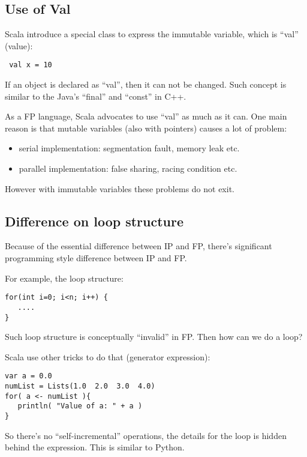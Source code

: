 \documentclass[notheorems, aspectratio=54]{beamer}
\begin{document}
\subsection{Use of Val}
\begin{frame}[fragile]

Scala introduce a special class to express the immutable variable, 
which is ``val'' (value):
\begin{verbatim}
 val x = 10
\end{verbatim}
If an object is declared as ``val'', then it can not be changed. Such concept 
is similar to the Java's ``final'' and ``const'' in C++. 

As a FP language, Scala advocates to use ``val'' as much as it can. One main reason is that mutable variables (also with pointers) causes a lot of problem:
\begin{itemize}
 \item serial implementation: segmentation fault, memory leak etc.
 \item parallel implementation: false sharing, racing condition etc.
\end{itemize}
However with immutable variables these problems do not exit.

\end{frame}

\subsection{Difference on loop structure}
\begin{frame}[fragile]

Because of the essential difference between IP and FP, there's 
significant programming style difference between IP and FP. 

For example, the loop structure:
\begin{verbatim}
for(int i=0; i<n; i++) {
   ....
}
\end{verbatim}
Such loop structure is conceptually ``invalid'' in FP. Then how can we do a loop?

Scala use other tricks to do that (generator expression):
\begin{verbatim}
var a = 0.0
numList = Lists(1.0  2.0  3.0  4.0)
for( a <- numList ){
   println( "Value of a: " + a )
} 
\end{verbatim}
So there's no ``self-incremental'' operations, the details for the loop is hidden behind the expression. This is similar to Python.

\end{frame}
\end{document}

